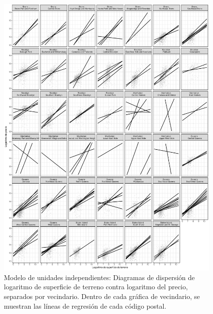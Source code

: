 \begin{figure}[H]
    \centering
    \includegraphics[width=\textwidth]{images/no_pooling_obs_vs_pred_train_by_neighborhood_zip_regression_lines.pdf}
    \caption{Modelo de unidades independientes: Diagramas de dispersión de logaritmo de superficie de terreno contra logaritmo del precio, separados por vecindario. Dentro de cada gráfica de vecindario, se muestran las líneas de regresión de cada código postal.}
    \label{fig:no_pooling_obs_vs_pred_train_by_neighborhood_zip_regression_lines}
\end{figure}

